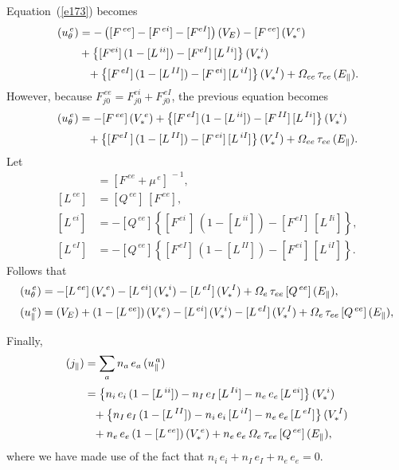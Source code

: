 \documentclass[12pt]{article}
\begin{document}
Equation~(\ref{e173}) becomes 
\begin{align}
[F^{\,ee}+\mu^{\,e}]\,(u_\theta^{\,e})& = -\left([F^{\,ee}]-[F^{\,ei}]-[F^{eI}]\right)(V_E)-[F^{\,ee}]\,(V_\ast^{\,e})\nonumber\\[0.5ex]&
+ \left\{[F^{ei}]\,(1-[L^{\,ii}])-[F^{eI}]\,[L^{\,Ii}]\right\}(V_\ast^{\,i})\nonumber\\[0.5ex]
&\phantom{=}
+ \left\{[F^{\,eI}]\,(1-[L^{\,II}])-[F^{\,ei}]\,[L^{\,iI}]\right\}(V_\ast^{\,I})+{\mit\Omega}_{ee}\,\tau_{ee}\,(E_\parallel).
\end{align}
However, because $F^{\,ee}_{j0}=F^{ei}_{j0}+F^{\,eI}_{j0}$, the previous equation becomes
\begin{align}
[F^{\,ee}+\mu^{\,e}]\,(u_\theta^{\,e})& =-[F^{\,ee}]\,(V_\ast^{\,e})
+ \left\{[F^{\,eI}]\,(1-[L^{\,ii}])-[F^{\,II}]\,[L^{\,Ii}]\right\}(V_\ast^{\,i})\nonumber\\[0.5ex]
&\phantom{=}
+ \left\{[F^{eI}\,]\,(1-[L^{\,II}])-[F^{\,ei}]\,[L^{\,iI}]\right\}(V_\ast^{\,I})+{\mit\Omega}_{ee}\,\tau_{ee}\,(E_\parallel).
\end{align}
Let
\begin{align}
[Q^{\,ee}] &= [F^{\,ee}+\mu^{\,e}]^{\,-1},\\[0.5ex]
[L^{\,ee}] &= [Q^{\,ee}]\,[F^{\,ee}],\\[0.5ex]
[L^{\,ei}] &= -[Q^{\,ee}]\left\{[F^{\,ei}\,]\,(1-[L^{\,ii}])-[F^{\,eI}]\,[L^{\,Ii}]\right\},\\[0.5ex]
[L^{\,eI}] &= -[Q^{\,ee}]\left\{[F^{\,eI}]\,(1-[L^{\,II}])-[F^{\,ei}]\,[L^{\,iI}]\right\}.
\end{align}
Follows that
\begin{align}
(u_\theta^{\,e}) &=-[L^{\,ee}]\,(V_{\ast}^{\,e})- [L^{\,ei}]\,(V_{\ast}^{\,i}) -[L^{\,eI}]\,(V_\ast^{\,I}) 
+ {\mit\Omega}_e\,\tau_{ee}\,[Q^{\,ee}]\,(E_\parallel),\\[0.5ex]
(u_\parallel^{\,e}) &= (V_E) + (1-[L^{\,ee}])\,(V_{\ast}^{\,e}) - [L^{\,ei}]\,(V_{\ast}^{\,i}) -[L^{\,eI}]\,(V_\ast^{\,I})
+ {\mit\Omega}_e\,\tau_{ee}\,[Q^{\,ee}]\,(E_\parallel),
\end{align}

Finally,
\begin{align}
(j_\parallel) &=\sum_a n_a\,e_a\,(u_\parallel^{\,a})\nonumber\\[0.5ex]
&=\left\{n_i\,e_i\,(1-[L^{\,ii}]) - n_I\,e_I\,[L^{\,Ii}] - n_e\,e_e\,[L^{\,ei}]\right\}(V_\ast^{\,i})\nonumber\\[0.5ex]
&\phantom{=}+\left\{n_I\,e_I\,(1-[L^{\,II}]) - n_i\,e_i\,[L^{\,iI}]-n_e\,e_e\,[L^{\,eI}]\right\}(V_\ast^{\,I})\nonumber\\[0.5ex]
&\phantom{=}+n_e\,e_e\,(1-[L^{\,ee}])\,(V_\ast^{\,e}) +n_e\,e_e\,{\mit\Omega}_e\,\tau_{ee}\,[Q^{\,ee}]\,(E_\parallel),
\end{align}
where we have made use of the fact that $n_i\,e_i+n_I\,e_I+n_e\,e_e=0$. 
\end{document}
